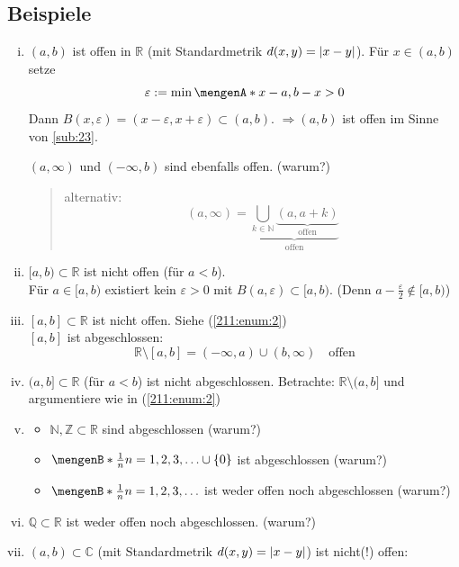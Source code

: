 \subsection[Beispiele für offene und abgeschlossene Mengen]{Beispiele} %
\label{sub:211}
\begin{enumerate}[(i)]
	\item $(a,b)$ ist offen in $\mathds{R}$ (mit Standardmetrik $d(x,y)= \lvert x-y\rvert $). Für $x \in (a,b)$ setze 
	\[
		\varepsilon := \min \set{x-a, b-x} >0
	\] 
	Dann $B(x, \varepsilon)= (x-\varepsilon, x+\varepsilon) \subset (a,b)$. $\Rightarrow (a,b)$ ist offen im Sinne von \ref{sub:23}.
	
	$(a,\infty)$ und $(- \infty, b)$ sind ebenfalls offen. \hfill (warum?)
	\begin{quote}
		alternativ: 
		\[
			(a, \infty) = \underbrace{\bigcup_{k \in \mathds{N}} \underbrace{(a, a+k)}_{\text{offen}}}_{\text{offen}}
		\]
	\end{quote}
	\item \label{211:enum:2}$[a,b) \subset \mathds{R}$ ist nicht offen (für $a<b$). \\
	Für $a \in [a,b)$ existiert kein $\varepsilon>0$ mit $B(a,\varepsilon) \subset [a,b)$. (Denn $a- \frac{\varepsilon}{2} \not\in [a,b)$)
	\item $[a,b] \subset \mathds{R}$ ist nicht offen. Siehe (\ref{211:enum:2}) \\
	$[a,b]$ ist abgeschlossen:
	\[
		\mathds{R} \setminus [a,b] = (- \infty, a) \cup (b, \infty) \quad \text{offen}
	\]
	\item $(a,b] \subset \mathds{R}$ (für $a<b$) ist nicht abgeschlossen. Betrachte: $\mathds{R} \setminus (a,b]$ und argumentiere wie in (\ref{211:enum:2})
	\item 
	\begin{itemize}
		\item $\mathds{N}, \mathds{Z} \subset \mathds{R}$ sind abgeschlossen \hfill (warum?)
		\item $\set[\frac{1}{n} ]{n=1,2,3, \ldots } \cup \{0\} $ ist abgeschlossen \hfill (warum?)
		\item $\set[\frac{1}{n} ]{n=1,2,3, \ldots }$ ist weder offen  noch abgeschlossen \hfill (warum?)
	\end{itemize}
	\item $\mathds{Q} \subset \mathds{R}$ ist weder offen noch abgeschlossen. \hfill (warum?)
	\item \label{211:enum:komplex}$(a,b) \subset \mathds{C}$ (mit Standardmetrik $d(x,y)= \lvert x-y\rvert$) ist nicht(!) offen:

\end{enumerate}

